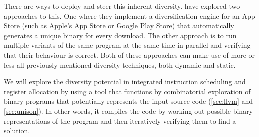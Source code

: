 There are ways to deploy and steer this inherent diversity. \textcite{compiler-generated-sw-div}
have explored two approaches to this. One where they implement a diversification engine for
an App Store (such as Apple's App Store or Google Play Store) that automatically generates
a unique binary for every download. The other approach is to run multiple variants of the
same program at the same time in parallel and verifying that their behaviour is correct.
Both of these approaches can make use of more or less all previously mentioned diversity
techniques, both dynamic and static.

We will explore the diversity potential in integrated instruction scheduling and register
allocation by using a tool that functions by combinatorial exploration of binary programs
that potentially represents the input source code (\ref{sec:llvm} and \ref{sec:unison}).
In other words, it compiles the code by working out possible binary representations of the
program and then iteratively verifying them to find a solution.

